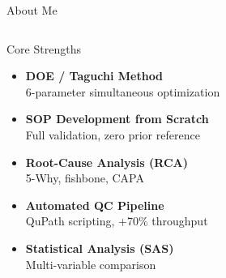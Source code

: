 \documentclass[aspectratio=169,10pt]{beamer}
\begin{document}
\begin{frame}{About Me}
\begin{columns}[T]
      \begin{block}{Core Strengths}
        \small
        \begin{itemize}
          \item \textbf{DOE / Taguchi Method}\\
                {\footnotesize 6-parameter simultaneous optimization}
          \item \textbf{SOP Development from Scratch}\\
                {\footnotesize Full validation, zero prior reference}
          \item \textbf{Root-Cause Analysis (RCA)}\\
                {\footnotesize 5-Why, fishbone, CAPA}
          \item \textbf{Automated QC Pipeline}\\
                {\footnotesize QuPath scripting, +70\% throughput}
          \item \textbf{Statistical Analysis (SAS)}\\
                {\footnotesize Multi-variable comparison}
        \end{itemize}
      \end{block}
  \end{columns}
\end{frame}

\end{document}
